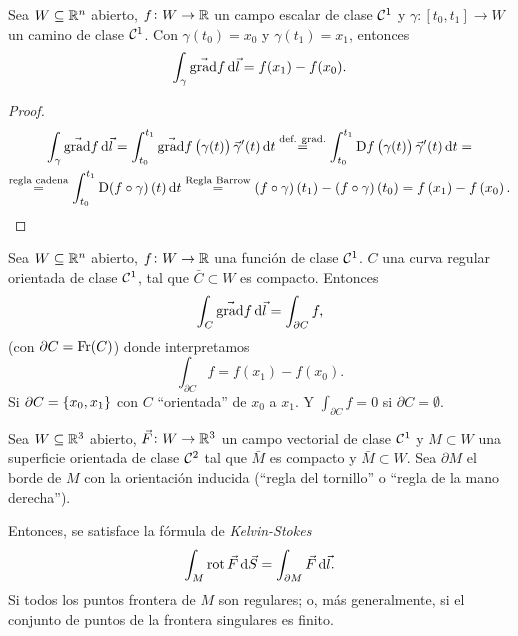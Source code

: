 \begin{prop}
    Sea $W \subseteq \mathbb{R}^n$ abierto, $f \colon W \to \mathbb{R}$ un campo escalar de clase $\mathcal{C}^1$ y $\gamma \colon [t_0,t_1] \to W$
    un camino de clase $\mathcal{C}^1$. Con $\gamma\left( t_0 \right) = x_0$ y $\gamma\left( t_1 \right) = x_1$, entonces
    \[
        \int_\gamma \vec{\grad} f \dif \vec{l} = f(x_1) - f(x_0).
    \]
\end{prop}
\begin{proof}
    \begin{gather*}
        \int_\gamma \vec{\grad} f \dif \vec{l} = \int^{t_1}_{t_0} \vec{\grad} f\left( \gamma(t) \right) \vec{\gamma}^\prime(t) \dif t
        \stackrel{\text{def. grad.}}{=} \int^{t_1}_{t_0} \Dif f\left( \gamma(t) \right) \vec{\gamma}^\prime (t) \dif t = \\
        \stackrel{\text{regla cadena}}{=} \int^{t_1}_{t_0} \Dif \left( f \circ \gamma \right)(t) \dif t \stackrel{\text{Regla Barrow}}{=}
        \left( f \circ \gamma \right)\left( t_1 \right) - \left( f \circ \gamma \right)\left( t_0 \right) = f\left( x_1 \right) - 
        f\left( x_0 \right).
    \end{gather*}
\end{proof}

\begin{teo}
    Sea $W \subseteq \mathbb{R}^n$ abierto, $f \colon W \to \mathbb{R}$ una función de clase $\mathcal{C}^1$. $C$ una curva regular orientada de clase
    $\mathcal{C}^1$, tal que $\bar{C} \subset W$ es compacto. Entonces
    \[
        \int_C \vec{\grad} f \dif \vec{l} = \int_{\partial C} f,
    \]
    (con $\partial C = \operatorname{Fr}(C)$) donde interpretamos
    \[
        \int_{\partial C} f = f\left( x_1 \right) - f\left( x_0 \right).
    \]
    Si $\partial C = \left\{x_0, x_1\right\}$ con $C$ ``orientada'' de $x_0$ a $x_1$. Y $\int_{\partial C} f = 0$ si $\partial C = \emptyset$.
\end{teo}
\begin{teo}\label{teo:kelvin-stokes}
    Sea $W \subseteq \mathbb{R}^3$ abierto, $\vec{F} \colon W \to \mathbb{R}^3$ un campo vectorial de clase $\mathcal{C}^1$ y $M \subset W$ una superficie
    orientada de clase $\mathcal{C}^2$ tal que $\bar{M}$ es compacto y $\bar{M} \subset W$. Sea $\partial M$ el borde de $M$ con la orientación
    inducida (``regla del tornillo'' o ``regla de la mano derecha'').

    Entonces, se satisface la fórmula de \emph{Kelvin-Stokes}
    \[
        \int_M \rot \vec{F} \dif \vec{S} = \int_{\partial M} \vec{F} \dif \vec{l}.
    \]
    Si todos los puntos frontera de $M$ son regulares; o, más generalmente, si el conjunto de puntos de la frontera singulares es finito.
\end{teo}

